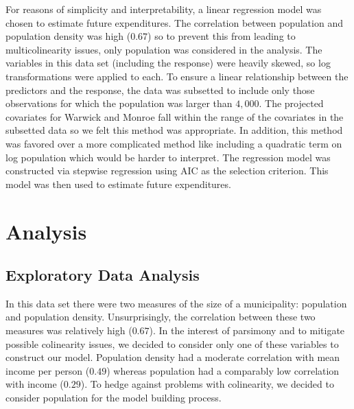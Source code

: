 \documentclass{article}\usepackage[]{graphicx}\usepackage[]{color}
\begin{document}
For reasons of simplicity and interpretability, a linear regression model was chosen to estimate future expenditures. The correlation between population and population density was high ($0.67$) so to prevent this from leading to multicolinearity issues, only population was considered in the analysis. The variables in this data set (including the response) were heavily skewed, so log transformations were applied to each. To ensure a linear relationship between the predictors and the response, the data was subsetted to include only those observations for which the population was larger than $4,000$. The projected covariates for Warwick and Monroe fall within the range of the covariates in the subsetted data so we felt this method was appropriate. In addition, this method was favored over a more complicated method like including a quadratic term on log population which would be harder to interpret. The regression model was constructed via stepwise regression using AIC as the selection criterion. This model was then used to estimate future expenditures.



\section{Analysis} \label{analysis}




\subsection{Exploratory Data Analysis} \label{eda}

In this data set there were two measures of the size of a municipality: population and population density. Unsurprisingly, the correlation between these two measures was relatively high ($0.67$). In the interest of parsimony and to mitigate possible colinearity issues, we decided to consider only one of these variables to construct our model. Population density had a moderate correlation with mean income per person ($0.49$) whereas population had a comparably low correlation with income ($0.29$). To hedge against problems with colinearity, we decided to consider population for the model building process.
\end{document}
